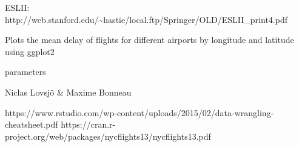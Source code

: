 \documentclass[a4paper]{book}
\begin{document}
%
\begin{References}\relax
ESLII: http://web.stanford.edu/\textasciitilde{}hastie/local.ftp/Springer/OLD/ESLII\_print4.pdf
\end{References}
%
\begin{Description}\relax
Plots the mean delay of ﬂights for different airports by longitude and latitude using ggplot2
\end{Description}
%
\begin{Arguments}
\begin{ldescription}
\item[\code{no}] parameters
\end{ldescription}
\end{Arguments}
%
\begin{Author}\relax
Niclas Lovsjö \& Maxime Bonneau
\end{Author}
%
\begin{References}\relax
https://www.rstudio.com/wp-content/uploads/2015/02/data-wrangling-cheatsheet.pdf
https://cran.r-project.org/web/packages/nycflights13/nycflights13.pdf
\end{References}
\printindex{}
\end{document}
